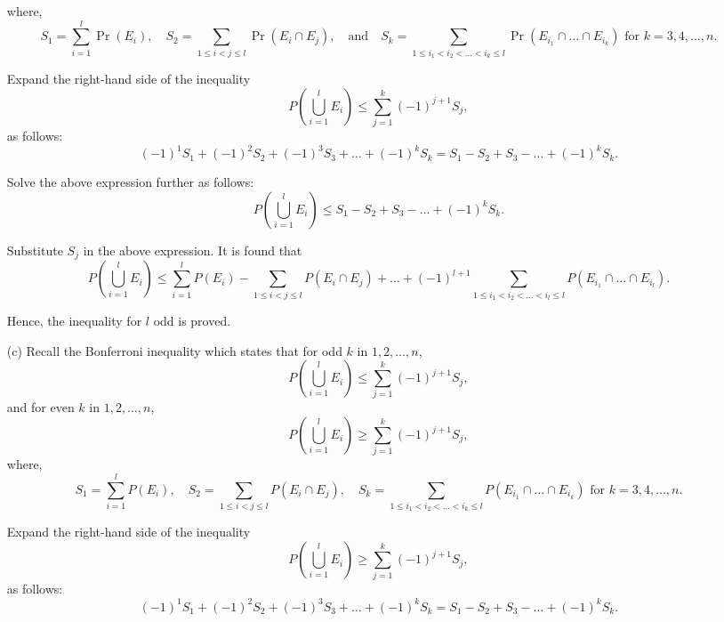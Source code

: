 \documentclass{article}
\begin{document}
\begin{enumerate}
  where,
\begin{equation*}
S_1 = \sum_{i=1}^{l} \Pr(E_i), \quad S_2 = \sum_{1 \leq i < j \leq l} \Pr(E_i \cap E_j), \quad \text{and} \quad S_k = \sum_{1 \leq i_1 < i_2 < \dots < i_k \leq l} \Pr(E_{i_1}\cap...\cap E_{i_k}) \text{ for } k = 3,4,\ldots,n.
\end{equation*}

Expand the right-hand side of the inequality
\begin{equation*}
P\left(\bigcup_{i=1}^{l} E_i\right) \leq \sum_{j=1}^{k} (-1)^{j+1} S_j,
\end{equation*}
as follows:
\begin{equation*}
(-1)^1 S_1 + (-1)^2 S_2 + (-1)^3 S_3 + \ldots + (-1)^k S_k = S_1 - S_2 + S_3 - \ldots + (-1)^k S_k.
\end{equation*}

Solve the above expression further as follows:
\begin{equation*}
P\left(\bigcup_{i=1}^{l} E_i\right) \leq S_1 - S_2 + S_3 - \ldots + (-1)^k S_k.
\end{equation*}

Substitute \( S_j \) in the above expression. It is found that
\begin{equation*}
P\left(\bigcup_{i=1}^{l} E_i\right) \leq \sum_{i=1}^{l} P(E_i) - \sum_{1 \leq i < j \leq l} P(E_i \cap E_j) + \ldots + (-1)^{l+1} \sum_{1 \leq i_1 < i_2 < \dots < i_l \leq l} P\left(E_{i_1}\cap...\cap E_{i_l}\right).
\end{equation*}

Hence, the inequality for \( l \) odd is proved.
\item[(c)] Recall the Bonferroni inequality which states that for odd \( k \) in \( 1,2,\ldots,n \),
\begin{equation*}
P\left(\bigcup_{i=1}^{l} E_i\right) \leq \sum_{j=1}^{k} (-1)^{j+1} S_j,
\end{equation*}
and for even \( k \) in \( 1,2,\ldots,n \),
\begin{equation*}
P\left(\bigcup_{i=1}^{l} E_i\right) \geq \sum_{j=1}^{k} (-1)^{j+1} S_j,
\end{equation*}
where,
\begin{equation*}
S_1 = \sum_{i=1}^{l} P(E_i), \quad S_2 = \sum_{1 \leq i < j \leq l} P(E_i \cap E_j), \quad S_k = \sum_{1 \leq i_1 < i_2 < \dots < i_k \leq l} P\left(E_{i_1}\cap...\cap E_{i_k}\right) \text{ for } k = 3,4,\ldots,n.
\end{equation*}

Expand the right-hand side of the inequality
\begin{equation*}
P\left(\bigcup_{i=1}^{l} E_i\right) \geq \sum_{j=1}^{k} (-1)^{j+1} S_j,
\end{equation*}
as follows:
\begin{equation*}
(-1)^1 S_1 + (-1)^2 S_2 + (-1)^3 S_3 + \ldots + (-1)^k S_k = S_1 - S_2 + S_3 - \ldots + (-1)^k S_k.
\end{equation*}


\end{enumerate}
\end{document}
